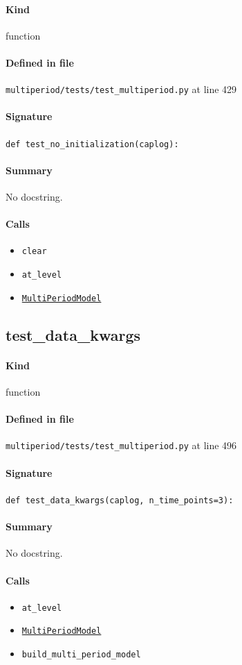 \documentclass[11pt]{report}
\begin{document}
\paragraph{Kind} function
\paragraph{Defined in file} \texttt{multiperiod/tests/test\_multiperiod.py} at line 429
\paragraph{Signature} \texttt{def test\_no\_initialization(caplog):}
\paragraph{Summary} No docstring.
\paragraph{Calls}
\begin{itemize}[leftmargin=*]
  \item \texttt{clear}
  \item \texttt{at\_level}
  \item \hyperref[def:multiperiod-multiperiod.py:MultiPeriodModel:L24]{\texttt{MultiPeriodModel}}
\end{itemize}
\subsection{test\_data\_kwargs}
\label{def:multiperiod-tests-test_multiperiod.py:test_data_kwargs:L496}
\paragraph{Kind} function
\paragraph{Defined in file} \texttt{multiperiod/tests/test\_multiperiod.py} at line 496
\paragraph{Signature} \texttt{def test\_data\_kwargs(caplog, n\_time\_points=3):}
\paragraph{Summary} No docstring.
\paragraph{Calls}
\begin{itemize}[leftmargin=*]
  \item \texttt{at\_level}
  \item \hyperref[def:multiperiod-multiperiod.py:MultiPeriodModel:L24]{\texttt{MultiPeriodModel}}
  \item \texttt{build\_multi\_period\_model}
\end{itemize}
\end{document}
